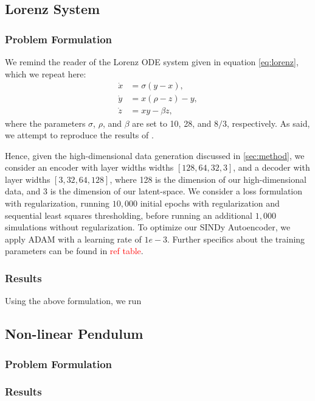 \subsection{Lorenz System}
\subsubsection{Problem Formulation}
We remind the reader of the Lorenz ODE system given in equation \ref{eq:lorenz}, which we repeat here:
\begin{equation*}
\begin{aligned}
    \dot{x} &= \sigma (y - x), \\
    \dot{y} &= x (\rho - z) - y, \\
    \dot{z} &= x y - \beta z,
\end{aligned}
\end{equation*}
where the parameters $\sigma$, $\rho$, and $\beta$ are set to 10, 28, and $8/3$, respectively. 
As said, we attempt to reproduce the results of \textcite{Champion_2019}.

Hence, given the high-dimensional data generation discussed in \ref{sec:method}, we consider an encoder with layer widths widths $[128, 64, 32, 3]$, and a decoder with layer widths $[3, 32, 64, 128]$, where 128 is the dimension of our high-dimensional data, and 3 is the dimension of our latent-space. 
We consider a loss formulation with regularization, running $10,000$ initial epochs with regularization and sequential least squares thresholding, before running an additional $1,000$ simulations without regularization. 
To optimize our SINDy Autoencoder, we apply \textsc{ADAM} with a learning rate of $1e-3$. 
Further specifics about the training parameters can be found in \textcolor{red}{ref table}. 

\subsubsection{Results}
Using the above formulation, we run 

\subsection{Non-linear Pendulum}
\subsubsection{Problem Formulation}

\subsubsection{Results}